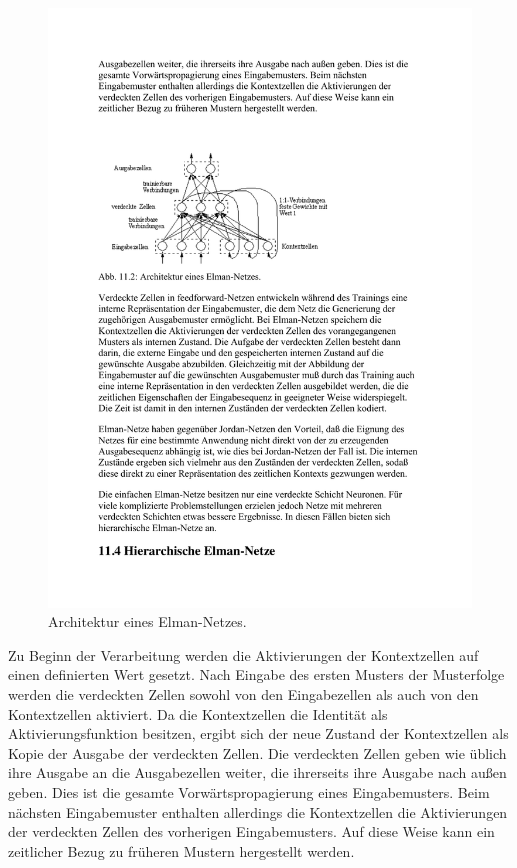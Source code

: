 \begin{figure}[ht!] \centering 
	\includegraphics[width=\linewidth]{figures/ch04_elman-netze.pdf}
	\caption{Architektur eines Elman-Netzes.}
	\label{fig:ch04_elman-netze}
\end{figure}

Zu Beginn der Verarbeitung werden die Aktivierungen der Kontextzellen auf einen definierten Wert gesetzt. Nach Eingabe des ersten Musters der Musterfolge werden die verdeckten Zellen sowohl von den Eingabezellen als auch von den Kontextzellen aktiviert.
Da die Kontextzellen die Identität als Aktivierungsfunktion besitzen, ergibt sich der neue Zustand der Kontextzellen als Kopie der Ausgabe der verdeckten Zellen. 
Die verdeckten Zellen geben wie üblich ihre Ausgabe an die Ausgabezellen weiter, die ihrerseits ihre Ausgabe nach außen geben. Dies ist die gesamte Vorwärtspropagierung eines Eingabemusters.
Beim nächsten Eingabemuster enthalten allerdings die Kontextzellen die Aktivierungen der verdeckten Zellen des vorherigen Eingabemusters. Auf diese Weise kann ein zeitlicher Bezug zu früheren Mustern hergestellt werden.

